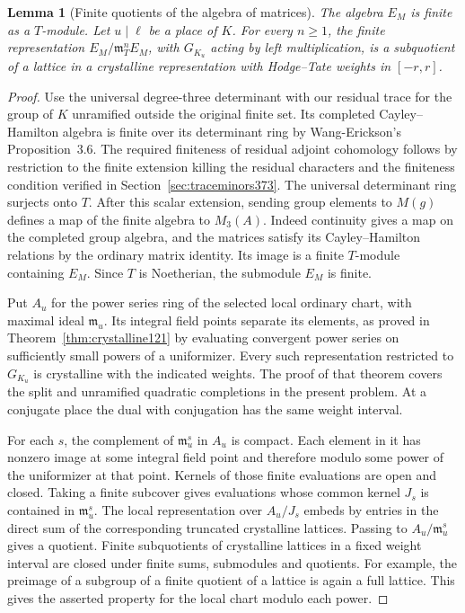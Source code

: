 \documentclass[a4paper,11pt]{article}
\newtheorem{lemma}[proposition]{Lemma}
\theoremstyle{definition}
\theoremstyle{remark}
\numberwithin{equation}{section}
\begin{document}
\begin{lemma}[Finite quotients of the algebra of matrices]
\label{lem:torsioncrys375}
The algebra \(E_M\) is finite as a \(T\)-module. Let \(u\mid\ell\)
be a place of \(K\). For every \(n\ge1\), the finite representation
\(E_M/\mathfrak m_T^n E_M\), with \(G_{K_u}\) acting by left
multiplication, is a subquotient of a lattice in a crystalline
representation with Hodge--Tate weights in \([-r,r]\).
\end{lemma}
\begin{proof}
Use the universal degree-three determinant with our residual
trace for the group of \(K\) unramified outside the original
finite set. Its completed Cayley--Hamilton algebra is finite
over its determinant ring by Wang-Erickson's Proposition~3.6.
The required finiteness of residual adjoint cohomology follows
by restriction to the finite extension killing the residual
characters and the finiteness condition verified in
Section~\ref{sec:traceminors373}. The universal determinant
ring surjects onto \(T\). After this scalar extension, sending
group elements to \(M(g)\) defines a map of the finite algebra
to \(M_3(A)\). Indeed continuity gives a map on the completed
group algebra, and the matrices satisfy its Cayley--Hamilton
relations by the ordinary matrix identity. Its image is a finite
\(T\)-module containing \(E_M\). Since \(T\) is Noetherian,
the submodule \(E_M\) is finite.~\cite{VII-V-wangerickson375}

Put \(A_u\) for the power series ring of the selected local
ordinary chart, with maximal ideal \(\mathfrak m_u\). Its
integral field points separate its elements, as proved in
Theorem~\ref{thm:crystalline121} by evaluating convergent
power series on sufficiently small powers of a uniformizer.
Every such representation restricted to \(G_{K_u}\) is
crystalline with the indicated weights. The proof of that
theorem covers the split and unramified quadratic completions
in the present problem. At a conjugate place the dual with
conjugation has the same weight interval.

For each \(s\), the complement of \(\mathfrak m_u^s\) in
\(A_u\) is compact. Each element in it has nonzero image
at some integral field point and therefore modulo some
power of the uniformizer at that point. Kernels of those
finite evaluations are open and closed. Taking a finite
subcover gives evaluations whose common kernel \(J_s\)
is contained in \(\mathfrak m_u^s\). The local representation
over \(A_u/J_s\) embeds by entries in the direct sum of the
corresponding truncated crystalline lattices. Passing to
\(A_u/\mathfrak m_u^s\) gives a quotient. Finite subquotients
of crystalline lattices in a fixed weight interval are closed
under finite sums, submodules and quotients. For example,
the preimage of a subgroup of a finite quotient of a lattice
is again a full lattice. This gives the asserted property
for the local chart modulo each power.


\end{proof}
\end{document}
